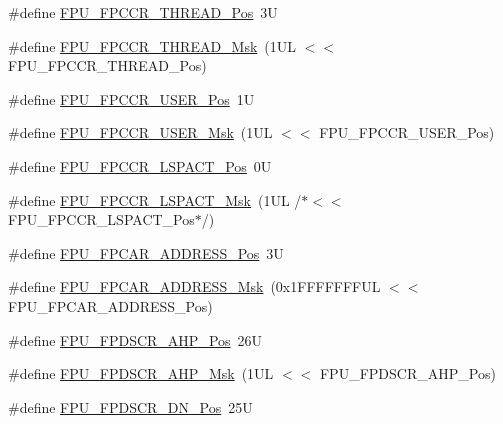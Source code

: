 \begin{DoxyCompactItemize}
\item 
\#define \hyperlink{group___c_m_s_i_s___f_p_u_ga0937d64c42374200af44b22e5b49fd26}{F\+P\+U\+\_\+\+F\+P\+C\+C\+R\+\_\+\+T\+H\+R\+E\+A\+D\+\_\+\+Pos}~3U
\item 
\#define \hyperlink{group___c_m_s_i_s___f_p_u_ga8d18cd88336d63d4b1810383aa8da700}{F\+P\+U\+\_\+\+F\+P\+C\+C\+R\+\_\+\+T\+H\+R\+E\+A\+D\+\_\+\+Msk}~(1\+U\+L $<$$<$ F\+P\+U\+\_\+\+F\+P\+C\+C\+R\+\_\+\+T\+H\+R\+E\+A\+D\+\_\+\+Pos)
\item 
\#define \hyperlink{group___c_m_s_i_s___f_p_u_gaea663104375ce6be15470e3db294c92d}{F\+P\+U\+\_\+\+F\+P\+C\+C\+R\+\_\+\+U\+S\+E\+R\+\_\+\+Pos}~1U
\item 
\#define \hyperlink{group___c_m_s_i_s___f_p_u_ga2eb70427eeaa7344196219cf5a8620a4}{F\+P\+U\+\_\+\+F\+P\+C\+C\+R\+\_\+\+U\+S\+E\+R\+\_\+\+Msk}~(1\+U\+L $<$$<$ F\+P\+U\+\_\+\+F\+P\+C\+C\+R\+\_\+\+U\+S\+E\+R\+\_\+\+Pos)
\item 
\#define \hyperlink{group___c_m_s_i_s___f_p_u_ga803bf3f6d15b04deaad0801bee5b35ed}{F\+P\+U\+\_\+\+F\+P\+C\+C\+R\+\_\+\+L\+S\+P\+A\+C\+T\+\_\+\+Pos}~0U
\item 
\#define \hyperlink{group___c_m_s_i_s___f_p_u_ga86e7c2fa52ba65c3b535dfa33f2586eb}{F\+P\+U\+\_\+\+F\+P\+C\+C\+R\+\_\+\+L\+S\+P\+A\+C\+T\+\_\+\+Msk}~(1\+U\+L /$\ast$$<$$<$ F\+P\+U\+\_\+\+F\+P\+C\+C\+R\+\_\+\+L\+S\+P\+A\+C\+T\+\_\+\+Pos$\ast$/)
\item 
\#define \hyperlink{group___c_m_s_i_s___f_p_u_gaf45377b7e45be8517ddbcf2028b80ae7}{F\+P\+U\+\_\+\+F\+P\+C\+A\+R\+\_\+\+A\+D\+D\+R\+E\+S\+S\+\_\+\+Pos}~3U
\item 
\#define \hyperlink{group___c_m_s_i_s___f_p_u_ga517d89370c81325c5387b9c3085ac554}{F\+P\+U\+\_\+\+F\+P\+C\+A\+R\+\_\+\+A\+D\+D\+R\+E\+S\+S\+\_\+\+Msk}~(0x1\+F\+F\+F\+F\+F\+F\+F\+U\+L $<$$<$ F\+P\+U\+\_\+\+F\+P\+C\+A\+R\+\_\+\+A\+D\+D\+R\+E\+S\+S\+\_\+\+Pos)
\item 
\#define \hyperlink{group___c_m_s_i_s___f_p_u_ga138f54bc002629ab3e4de814c58abb29}{F\+P\+U\+\_\+\+F\+P\+D\+S\+C\+R\+\_\+\+A\+H\+P\+\_\+\+Pos}~26U
\item 
\#define \hyperlink{group___c_m_s_i_s___f_p_u_gab2789cebebda5fda8c4e9d87e24f32be}{F\+P\+U\+\_\+\+F\+P\+D\+S\+C\+R\+\_\+\+A\+H\+P\+\_\+\+Msk}~(1\+U\+L $<$$<$ F\+P\+U\+\_\+\+F\+P\+D\+S\+C\+R\+\_\+\+A\+H\+P\+\_\+\+Pos)
\item 
\#define \hyperlink{group___c_m_s_i_s___f_p_u_ga41776b80fa450ef2ea6d3fee89aa35f2}{F\+P\+U\+\_\+\+F\+P\+D\+S\+C\+R\+\_\+\+D\+N\+\_\+\+Pos}~25U
\item 

\end{DoxyCompactItemize}
